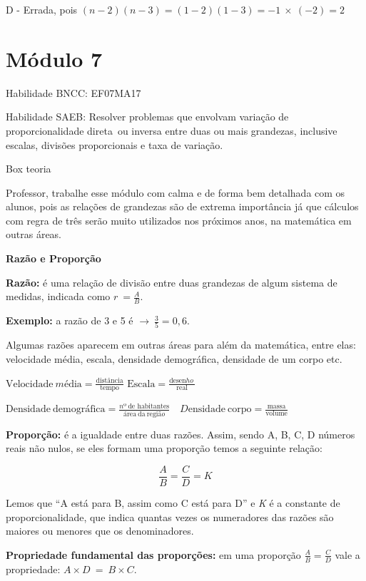 D - Errada, pois
\(\left( n - 2 \right)\left( n - 3 \right) = \left( 1 - 2 \right)\left( 1 - 3 \right) = - 1\  \times \ ( - 2) = 2\)

\section{Módulo 7}

Habilidade BNCC: EF07MA17

Habilidade SAEB: Resolver problemas que envolvam variação de
proporcionalidade direta~ou inversa entre duas ou mais grandezas,
inclusive escalas, divisões proporcionais e taxa de variação.

Box teoria

Professor, trabalhe esse módulo com calma e de forma bem detalhada com
os alunos, pois as relações de grandezas são de extrema importância já
que cálculos com regra de três serão muito utilizados nos próximos anos,
na matemática em outras áreas.

\textbf{Razão e Proporção}

\textbf{{Razão:}} é uma relação de divisão entre duas grandezas de algum
sistema de medidas, indicada como \(r\  = \frac{A}{B}\).

\textbf{Exemplo:} a razão de 3 e 5 é
\(\rightarrow \ \frac{3}{5} = 0,6.\)

Algumas razões aparecem em outras áreas para além da matemática, entre
elas: velocidade média, escala, densidade demográfica, densidade de um
corpo etc.

\(\text{Vel}\text{ocidade}\ mé\text{dia} = \frac{\text{dist}â\text{ncia}}{\text{tempo}}\)
\(\text{Escala} = \frac{\text{desen}ho\ }{\text{real}}\ \)

\(\text{Densidade}\ \text{demogr}á\text{fica} = \frac{nº\ \text{de}\text{\ h}\text{abitantes}}{á\text{rea}\ \text{da}\ \text{regi}ão}\)
\(\text{\ \ \ \ \ \ \ \ \ \ \ \ \ \ \ \ \ \ \ \ \ \ \ \ \ }D\text{ensidade}\ \text{corpo} = \frac{\text{massa}}{\text{volume}}\)

\textbf{{Proporção:}} é a igualdade entre duas razões. Assim, sendo A,
B, C, D números reais não nulos, se eles formam uma proporção temos a
seguinte relação:

\[\frac{A}{B} = \frac{C}{D} = K\]

Lemos que ``A está para B, assim como C está para D'' e \emph{K} é a
constante de proporcionalidade, que indica quantas vezes os numeradores
das razões são maiores ou menores que os denominadores.

\textbf{{Propriedade fundamental das proporções:}} em uma proporção
\(\frac{A}{B} = \frac{C}{D}\) vale a propriedade:
\(A \times D\  = \ B \times C\).

